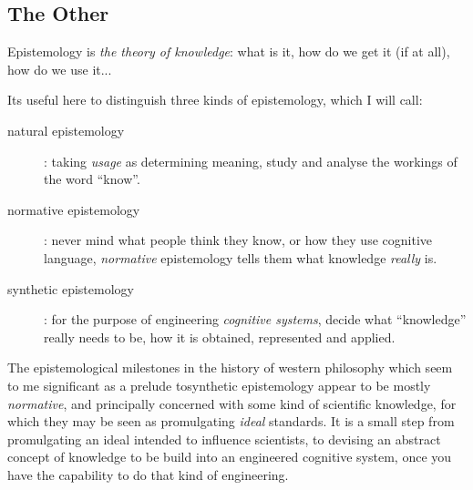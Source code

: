 \documentclass[14pt,titlepage]{extarticle}
\begin{document}
\subsection{The Other}

Epistemology is {\it the theory of knowledge}: what is it, how do we get it (if at all), how do we use it...

Its useful here to distinguish three kinds of epistemology, which I will call:
\begin{description}
\item [natural epistemology]:
  taking {\it usage} as determining meaning, study and analyse the workings of the word ``know''.
\item [normative epistemology]:
  never mind what people think they know, or how they use cognitive language, \emph{normative} epistemology tells them what knowledge \emph{really} is.
\item [synthetic epistemology]:
  for the purpose of engineering \emph{cognitive systems}, decide what ``knowledge'' really needs to be, how it is obtained, represented and applied.
\end{description}

The epistemological milestones in the history of western philosophy which seem to me significant as a prelude tosynthetic epistemology appear to be mostly \emph{normative}, and principally concerned with some kind of scientific knowledge, for which they may be seen as promulgating \emph{ideal} standards.
It is a small step from promulgating an ideal intended to influence scientists, to devising an abstract concept of knowledge to be build into an engineered cognitive system, once you have the capability to do that kind of engineering.
\end{document}
